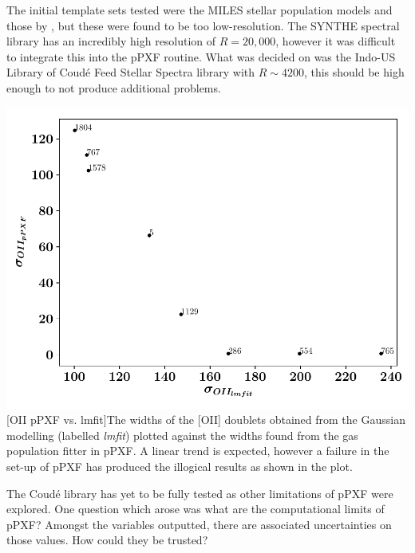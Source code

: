 \documentclass[12pt, twocolumn]{revtex4}    %
\begin{document}

The initial template sets tested were the MILES stellar population models \citep{vazdekis_miles} and those by \cite{jacoby_spectra}, but these were found to be too low-resolution. The SYNTHE spectral library \citep{munari_synthe} has an incredibly high resolution of $R=20,000$, however it was difficult to integrate this into the pPXF routine. What was decided on was the Indo-US Library of Coud{\'e} Feed Stellar Spectra \citep{valdes_coude} library with $R\sim4200$, this should be high enough to not produce additional problems.

\begin{center}
\includegraphics[width=1.0\linewidth]{data/oii_ppxf_vs_oii_lmfit}
[OII pPXF vs. lmfit]{The widths of the [OII] doublets obtained from the Gaussian modelling (labelled \textit{lmfit}) plotted against the widths found from the gas population fitter in pPXF. A linear trend is expected, however a failure in the set-up of pPXF has produced the illogical results as shown in the plot.}
\label{fig:oii_widths}
\end{center}

The Coud{\'e} library has yet to be fully tested as other limitations of pPXF were explored. One question which arose was what are the computational limits of pPXF? Amongst the variables outputted, there are associated uncertainties on those values. How could they be trusted? 
\end{document}
